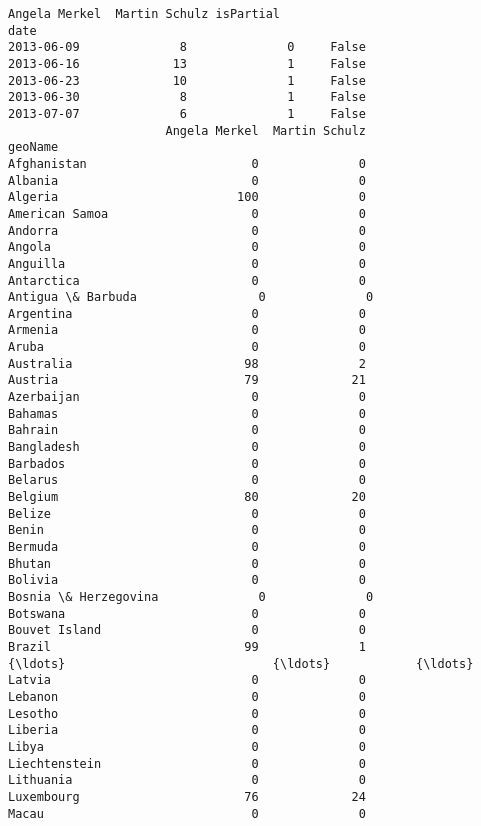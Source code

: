 \documentclass[11pt]{article}
\begin{document}
    \begin{Verbatim}[commandchars=\\\{\}]
            Angela Merkel  Martin Schulz isPartial
date                                              
2013-06-09              8              0     False
2013-06-16             13              1     False
2013-06-23             10              1     False
2013-06-30              8              1     False
2013-07-07              6              1     False
                      Angela Merkel  Martin Schulz
geoName                                           
Afghanistan                       0              0
Albania                           0              0
Algeria                         100              0
American Samoa                    0              0
Andorra                           0              0
Angola                            0              0
Anguilla                          0              0
Antarctica                        0              0
Antigua \& Barbuda                 0              0
Argentina                         0              0
Armenia                           0              0
Aruba                             0              0
Australia                        98              2
Austria                          79             21
Azerbaijan                        0              0
Bahamas                           0              0
Bahrain                           0              0
Bangladesh                        0              0
Barbados                          0              0
Belarus                           0              0
Belgium                          80             20
Belize                            0              0
Benin                             0              0
Bermuda                           0              0
Bhutan                            0              0
Bolivia                           0              0
Bosnia \& Herzegovina              0              0
Botswana                          0              0
Bouvet Island                     0              0
Brazil                           99              1
{\ldots}                             {\ldots}            {\ldots}
Latvia                            0              0
Lebanon                           0              0
Lesotho                           0              0
Liberia                           0              0
Libya                             0              0
Liechtenstein                     0              0
Lithuania                         0              0
Luxembourg                       76             24
Macau                             0              0

\end{Verbatim}
\end{document}
